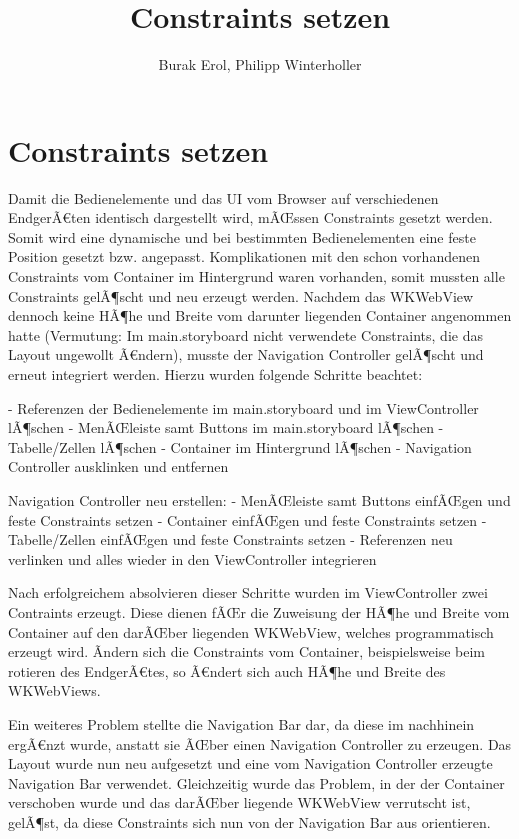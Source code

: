 
\title{Constraints setzen}
\author{Burak Erol, Philipp Winterholler}

\section{Constraints setzen}

Damit die Bedienelemente und das UI vom Browser auf verschiedenen EndgerÃ€ten identisch dargestellt wird, mÃŒssen Constraints gesetzt werden. Somit wird eine dynamische und bei bestimmten Bedienelementen eine feste Position gesetzt bzw. angepasst. Komplikationen mit den schon vorhandenen Constraints vom Container im Hintergrund waren vorhanden, somit mussten alle Constraints gelÃ¶scht und neu erzeugt werden. Nachdem das WKWebView dennoch keine HÃ¶he und Breite vom darunter liegenden Container angenommen hatte (Vermutung: Im main.storyboard nicht verwendete Constraints, die das Layout ungewollt Ã€ndern), musste der Navigation Controller gelÃ¶scht und erneut integriert werden. Hierzu wurden folgende Schritte beachtet:

- Referenzen der Bedienelemente im main.storyboard und im ViewController lÃ¶schen 
- MenÃŒleiste samt Buttons im main.storyboard lÃ¶schen 
- Tabelle/Zellen lÃ¶schen
- Container im Hintergrund lÃ¶schen
- Navigation Controller ausklinken und entfernen

Navigation Controller neu erstellen:
- MenÃŒleiste samt Buttons einfÃŒgen und feste Constraints setzen
- Container einfÃŒgen und feste Constraints setzen
- Tabelle/Zellen einfÃŒgen und feste Constraints setzen
- Referenzen neu verlinken und alles wieder in den ViewController integrieren

Nach erfolgreichem absolvieren dieser Schritte wurden im ViewController zwei Contraints erzeugt. Diese dienen fÃŒr die Zuweisung der HÃ¶he und Breite vom Container auf den darÃŒber liegenden WKWebView, welches programmatisch erzeugt wird. Ãndern sich die Constraints vom Container, beispielsweise beim rotieren des EndgerÃ€tes, so Ã€ndert sich auch HÃ¶he und Breite des WKWebViews.

Ein weiteres Problem stellte die Navigation Bar dar, da diese im nachhinein ergÃ€nzt wurde, anstatt sie ÃŒber einen Navigation Controller zu erzeugen. Das Layout wurde nun neu aufgesetzt und eine vom Navigation Controller erzeugte Navigation Bar verwendet. Gleichzeitig wurde das Problem, in der der Container verschoben wurde und das darÃŒber liegende WKWebView verrutscht ist, gelÃ¶st, da diese Constraints sich nun von der Navigation Bar aus orientieren.

